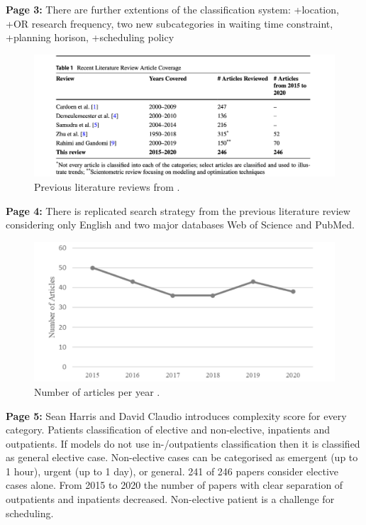     \textbf{Page 3:}
    There are further extentions of the classification system: +location, +OR research frequency, two new subcategories in waiting time constraint, +planning horison, +scheduling policy
    \begin{figure}[H]
        \centering
        \includegraphics[width=1\textwidth]{figures/SR0002US22/fig1.png}
        \caption{Previous literature reviews from \cite{x079}.}
        \label{fig1:SR0002US22}
    \end{figure}
    
    \textbf{Page 4:}
    There is replicated search strategy from the previous literature review considering only English and two major databases Web of Science and PubMed.
    \begin{figure}[H]
        \centering
        \includegraphics[width=1\textwidth]{figures/SR0002US22/fig2.png}
        \caption{Number of articles per year \cite{x079}.}
        \label{fig2:SR0002US22}
    \end{figure}
    
    \textbf{Page 5:}
    Sean Harris and David Claudio introduces complexity score for every category. Patients classification of elective and non-elective, inpatients and outpatients. If models do not use in-/outpatients classification then it is classified as general elective case. Non-elective cases can be categorised as emergent (up to 1 hour), urgent (up to 1 day), or general. 241 of 246 papers consider elective cases alone. From 2015 to 2020 the number of papers with clear separation of outpatients and inpatients decreased. Non-elective patient is a challenge for scheduling.

